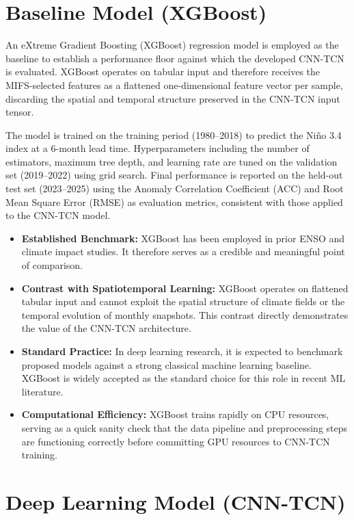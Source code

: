 \section{Baseline Model (XGBoost)}
\label{sec:baseline-model}

An eXtreme Gradient Boosting (XGBoost) regression model is employed as the baseline to establish a performance floor against which the developed CNN-TCN is evaluated. XGBoost operates on tabular input and therefore receives the MIFS-selected features as a flattened one-dimensional feature vector per sample, discarding the spatial and temporal structure preserved in the CNN-TCN input tensor.

The model is trained on the training period (1980--2018) to predict the Ni\~{n}o 3.4 index at a 6-month lead time. Hyperparameters including the number of estimators, maximum tree depth, and learning rate are tuned on the validation set (2019--2022) using grid search. Final performance is reported on the held-out test set (2023--2025) using the Anomaly Correlation Coefficient (ACC) and Root Mean Square Error (RMSE) as evaluation metrics, consistent with those applied to the CNN-TCN model.

\begin{itemize}
    \item \textbf{Established Benchmark:} XGBoost has been employed in prior ENSO and climate impact studies. It therefore serves as a credible and meaningful point of comparison.
    \item \textbf{Contrast with Spatiotemporal Learning:} XGBoost operates on flattened tabular input and cannot exploit the spatial structure of climate fields or the temporal evolution of monthly snapshots. This contrast directly demonstrates the value of the CNN-TCN architecture.
    \item \textbf{Standard Practice:} In deep learning research, it is expected to benchmark proposed models against a strong classical machine learning baseline. XGBoost is widely accepted as the standard choice for this role in recent ML literature.
    \item \textbf{Computational Efficiency:} XGBoost trains rapidly on CPU resources, serving as a quick sanity check that the data pipeline and preprocessing steps are functioning correctly before committing GPU resources to CNN-TCN training.
\end{itemize}

\section{Deep Learning Model (CNN-TCN)}
\label{sec:cnn-tcn}

